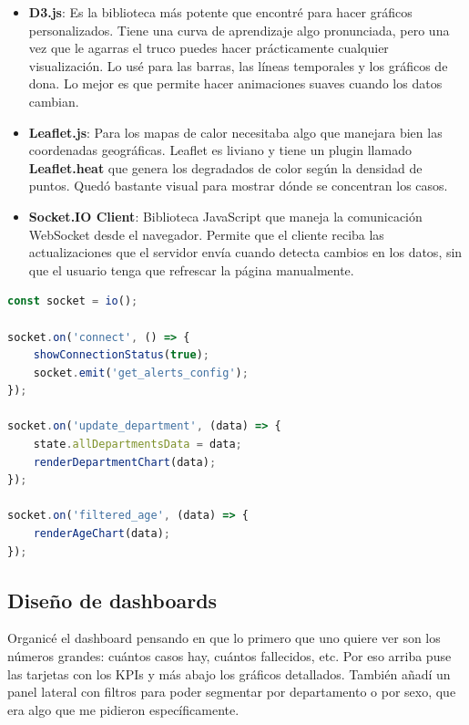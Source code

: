 \documentclass[12pt,a4paper]{article}
\begin{document}
\begin{itemize}
    \item \textbf{D3.js}: Es la biblioteca más potente que encontré para hacer gráficos personalizados. Tiene una curva de aprendizaje algo pronunciada, pero una vez que le agarras el truco puedes hacer prácticamente cualquier visualización. Lo usé para las barras, las líneas temporales y los gráficos de dona. Lo mejor es que permite hacer animaciones suaves cuando los datos cambian.

    \item \textbf{Leaflet.js}: Para los mapas de calor necesitaba algo que manejara bien las coordenadas geográficas. Leaflet es liviano y tiene un plugin llamado \textbf{Leaflet.heat} que genera los degradados de color según la densidad de puntos. Quedó bastante visual para mostrar dónde se concentran los casos.

    \item \textbf{Socket.IO Client}: Biblioteca JavaScript que maneja la comunicación WebSocket desde el navegador. Permite que el cliente reciba las actualizaciones que el servidor envía cuando detecta cambios en los datos, sin que el usuario tenga que refrescar la página manualmente.
\end{itemize}

\begin{lstlisting}[language=JavaScript, caption={Conexión WebSocket y manejo de eventos en el cliente}, label={lst:socketio-client}]
const socket = io();

socket.on('connect', () => {
    showConnectionStatus(true);
    socket.emit('get_alerts_config');
});

socket.on('update_department', (data) => {
    state.allDepartmentsData = data;
    renderDepartmentChart(data);
});

socket.on('filtered_age', (data) => {
    renderAgeChart(data);
});
\end{lstlisting}

\subsection{Diseño de dashboards}\label{diseuxf1o-de-dashboards}

Organicé el dashboard pensando en que lo primero que uno quiere ver son los números grandes: cuántos casos hay, cuántos fallecidos, etc. Por eso arriba puse las tarjetas con los KPIs y más abajo los gráficos detallados. También añadí un panel lateral con filtros para poder segmentar por departamento o por sexo, que era algo que me pidieron específicamente.
\end{document}
